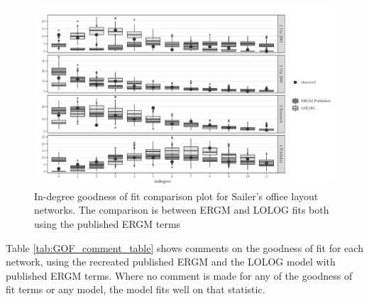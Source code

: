 \documentclass[
]{statsoc}
\begin{document}
\begin{figure}

{\centering \includegraphics{lolog_catalog_files/figure-latex/unnamed-chunk-6-1} 

}

\caption{\label{fig:sailer_gof_pub_ideg}  In-degree goodness of fit comparison plot for Sailer's office layout networks. The comparison is between ERGM and LOLOG fits both using the published ERGM terms}\label{fig:unnamed-chunk-6}
\end{figure}

Table \ref{tab:GOF_comment_table} shows comments on the goodness of fit
for each network, using the recreated published ERGM and the LOLOG model
with published ERGM terms. Where no comment is made for any of the
goodness of fit terms or any model, the model fits well on that
statistic.
\end{document}
